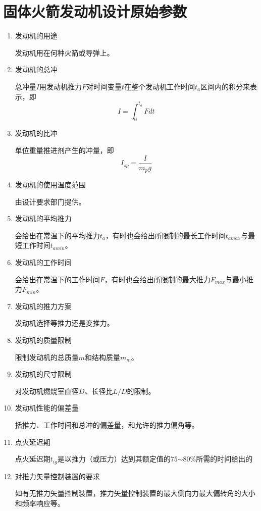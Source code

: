 \section{固体火箭发动机设计原始参数}
\begin{enumerate}[leftmargin=2em]
  \item 发动机的用途
  
  发动机用在何种火箭或导弹上。
  \item 发动机的总冲
  
  总冲量$I$用发动机推力$F$对时间变量$t$在整个发动机工作时间$t_{a}$区间内的积分来表示，即
  \[
    I=\int_{0}^{t_{a}} Fdt
  \]
  \item 发动机的比冲
  
  单位重量推进剂产生的冲量，即
  \[
    I_{sp}=\frac{I}{m_{p}g} 
  \]
  \item 发动机的使用温度范围
  
  由设计要求部门提供。

  \item 发动机的平均推力
  
  会给出在常温下的平均推力$t_{a}$，有时也会给出所限制的最长工作时间$t_{amax}$与最短工作时间$t_{amin}$。

  \item 发动机的工作时间
  
  会给出在常温下的工作时间$\bar{F} $，有时也会给出所限制的最大推力$F_{max}$与最小推力$F_{min}$。

  \item 发动机的推力方案
  
  发动机选择等推力还是变推力。

  \item 发动机的质量限制
  
  限制发动机的总质量$m$和结构质量$m_{m}$。

  \item 发动机的尺寸限制
  
  对发动机燃烧室直径$D$、长径比$L/D$的限制。

  \item 发动机性能的偏差量
  
  括推力、工作时间和总冲的偏差量，和允许的推力偏角等。

  \item 点火延迟期
  
  点火延迟期$t_{ig}$是以推力（或压力）达到其额定值的75$\sim$80\%所需的时间给出的

  \item 对推力矢量控制装置的要求
  
  如有无推力矢量控制装置，推力矢量控制装置的最大侧向力最大偏转角的大小和频率响应等。


\end{enumerate}
